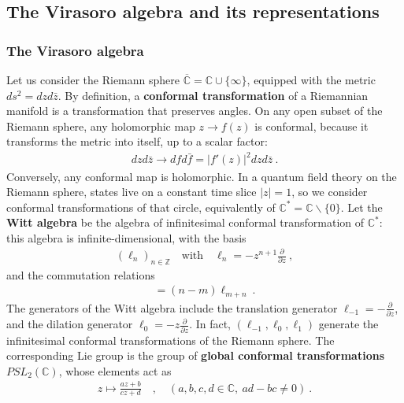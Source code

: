 \documentclass[12pt, a4paper]{article}
\newcommand{\myindex}[1]{\textbf{\boldmath #1}}
\theoremstyle{break}
\begin{document}
\subsection{The Virasoro algebra and its representations}\label{sec:vir}

\subsubsection{The Virasoro algebra}

Let us consider the Riemann sphere $\overline{\mathbb{C}}=\mathbb{C}\cup \{\infty\}$, equipped with the metric $ds^2 = dzd\bar z$. By definition, a \myindex{conformal transformation} of a Riemannian manifold is a transformation that preserves angles. On any open subset of the Riemann sphere, any holomorphic map $z\to f(z)$ is conformal, because it transforms the metric into itself, up to a scalar factor: 
\begin{align}
 dzd\bar z\to dfd\bar f = |f'(z)|^2 dzd\bar z\ .
\end{align}
Conversely, any conformal map is holomorphic. 
In a quantum field theory on the Riemann sphere, states live on a constant time slice $|z|=1$, so we consider conformal transformations of that circle, equivalently of $\mathbb{C}^*= \mathbb{C}\backslash \{0\}$.
Let the \myindex{Witt algebra} be the algebra of infinitesimal conformal transformation of $\mathbb{C}^*$: this algebra is infinite-dimensional, with the basis 
\begin{align}
 \left(\ell_n\right)_{n\in\mathbb{Z}}  \quad \text{with} \quad \ell_n = -z^{n+1}\frac{\partial}{\partial z}\ ,
 \label{lpz}
\end{align}
and the commutation relations 
\begin{align}
 [\ell_n,\ell_m] = (n-m)\ell_{m+n}\ .
\end{align}
The generators of the Witt algebra include the translation generator $\ell_{-1} = -\frac{\partial}{\partial z}$, and the dilation generator $\ell_0 = -z\frac{\partial}{\partial z}$. In fact, $(\ell_{-1},\ell_0,\ell_1)$ generate the infinitesimal conformal transformations of the Riemann sphere.
The corresponding Lie group is the group of \myindex{global conformal transformations} $PSL_2(\mathbb{C})$, whose elements act as 
\begin{align}
 z \mapsto \frac{az+b}{cz+d}\quad , \quad (a,b,c,d\in \mathbb{C},\ ad-bc\neq 0)\ .
 \label{abcd}
\end{align}
\end{document}
